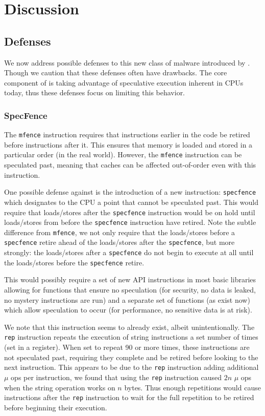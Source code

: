 
\section{Discussion}

\subsection{Defenses}
We now address possible defenses to this new class of malware introduced by
\speculake. Though we caution that these defenses often have drawbacks. The core
component of \speculake is taking advantage of speculative execution inherent in
CPUs today, thus these defenses focus on limiting this behavior.

\subsubsection{SpecFence}
The \texttt{mfence} instruction requires that instructions earlier in the code
be retired before instructions after it. This ensures that memory is loaded and
stored in a particular order (in the real world). However, the \texttt{mfence}
instruction can be speculated past, meaning that caches can be affected
out-of-order even with this instruction.

One possible defense against \speculake is the introduction of a new
instruction: \texttt{specfence} which designates to the CPU a point that cannot 
be speculated past. This would require that loads/stores after the 
\texttt{specfence} instruction would be on hold until loads/stores from before
the \texttt{specfence} instruction have retired. Note the subtle difference from
\texttt{mfence}, we not only require that the loads/stores before a
\texttt{specfence} retire ahead of the loads/stores after the 
\texttt{specfence}, but more strongly: the loads/stores after a 
\texttt{specfence} do not begin to execute at all until the loads/stores before
the \texttt{specfence} retire.

This would possibly require a set of new API instructions in most basic
libraries allowing for functions that ensure no speculation (for security, no
data is leaked, no mystery instructions are run) and a separate set of functions
(as exist now) which allow speculation to occur (for performance, no sensitive
data is at risk).

We note that this instruction seems to already exist, albeit unintentionally.
The \texttt{rep} instruction repeats the execution of string instructions a set
number of times (set in a register). When set to repeat 90 or more times, these
instructions are not speculated past, requiring they complete and be retired
before looking to the next instruction. This appears to be due to the 
\texttt{rep} instruction adding additional $\mu$ ops per instruction, we found
that using the \texttt{rep} instruction caused $2n$ $\mu$ ops when the string
operation works on $n$ bytes. Thus enough repetitions would cause instructions
after the \texttt{rep} instruction to wait for the full repetition to be retired
before beginning their execution.

